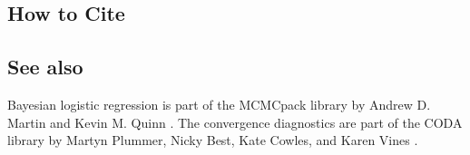 \subsection* {How to Cite} 



\subsection*{See also}
Bayesian logistic regression is part of the MCMCpack library by Andrew D. Martin and Kevin M. Quinn \citep{MarQui05}. The convergence diagnostics are part of the CODA library by Martyn Plummer, Nicky Best, Kate Cowles, and Karen Vines \citep{PluBesCowVin05}.
